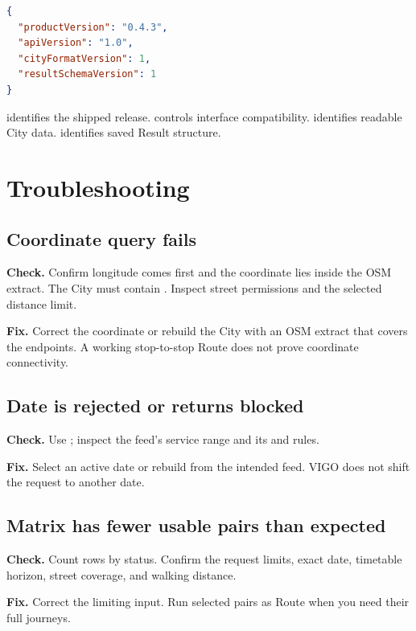 \documentclass[10pt,letterpaper]{article}
\begin{document}
\begin{lstlisting}[language=json]
{
  "productVersion": "0.4.3",
  "apiVersion": "1.0",
  "cityFormatVersion": 1,
  "resultSchemaVersion": 1
}
\end{lstlisting}

 identifies the shipped release.  controls interface compatibility.  identifies readable City data.  identifies saved Result structure.

\section{Troubleshooting}

\subsection{Coordinate query fails}

\textbf{Check.} Confirm longitude comes first and the coordinate lies inside the OSM extract. The City must contain . Inspect street permissions and the selected distance limit.

\textbf{Fix.} Correct the coordinate or rebuild the City with an OSM extract that covers the endpoints. A working stop-to-stop Route does not prove coordinate connectivity.

\subsection{Date is rejected or returns blocked}

\textbf{Check.} Use ; inspect the feed's service range and its  and  rules.

\textbf{Fix.} Select an active date or rebuild from the intended feed. VIGO does not shift the request to another date.

\subsection{Matrix has fewer usable pairs than expected}

\textbf{Check.} Count rows by status. Confirm the request limits, exact date, timetable horizon, street coverage, and walking distance.

\textbf{Fix.} Correct the limiting input. Run selected pairs as Route when you need their full journeys.
\end{document}
